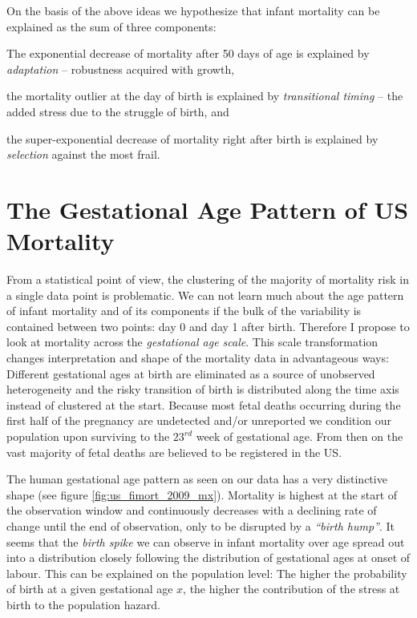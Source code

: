\documentclass[
  12pt
]{scrartcl}
\begin{document}
On the basis of the above ideas we hypothesize that infant mortality can be explained as the sum of three components:
\begin{compactenum}
  \item The exponential decrease of mortality after 50 days of age is explained by \emph{adaptation} -- robustness acquired with growth,
  \item the mortality outlier at the day of birth is explained by \emph{transitional timing} -- the added stress due to the struggle of birth, and
  \item the super-exponential decrease of mortality right after birth is explained by \emph{selection} against the most frail.
\end{compactenum}

\section{The Gestational Age Pattern of US Mortality} %
\label{sec:the_gestational_age_transformation}

From a statistical point of view, the clustering of the majority of mortality risk in a single data point is problematic. We can not learn much about the age pattern of infant mortality and of its components if the bulk of the variability is contained between two points: day 0 and day 1 after birth. Therefore I propose to look at mortality across the \emph{gestational age scale}. This scale transformation changes interpretation and shape of the mortality data in advantageous ways: Different gestational ages at birth are eliminated as a source of unobserved heterogeneity and the risky transition of birth is distributed along the time axis instead of clustered at the start. Because most fetal deaths occurring during the first half of the pregnancy are undetected and/or unreported we condition our population upon surviving to the $23^{rd}$ week of gestational age. From then on the vast majority of fetal deaths are believed to be registered in the US.

The human gestational age pattern as seen on our data has a very distinctive shape (see figure \ref{fig:us_fimort_2009_mx}). Mortality is highest at the start of the observation window and continuously decreases with a declining rate of change until the end of observation, only to be disrupted by a \emph{\enquote{birth hump}}. It seems that the \emph{birth spike} we can observe in infant mortality over age spread out into a distribution closely following the distribution of gestational ages at onset of labour. This can be explained on the population level: The higher the probability of birth at a given gestational age $x$, the higher the contribution of the stress at birth to the population hazard.
\end{document}
